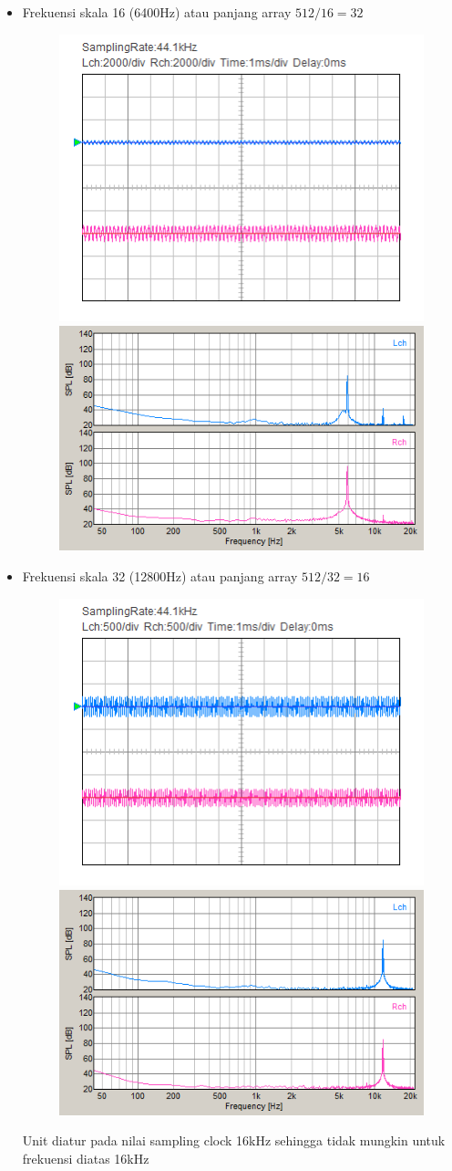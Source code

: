 \documentclass[12pt,]{article}
\begin{document}
\begin{itemize}
\begin{itemize}
			\item Frekuensi skala 16 (6400Hz) atau panjang array $512/16=32$
			\begin{figure}[H]
				\centering
				\includegraphics[width=0.45\linewidth]{result/day_4/osi_sine16}
				\includegraphics[width=0.45\linewidth]{result/day_4/fft_sine16}
			\end{figure}
		
			\item Frekuensi skala 32 (12800Hz) atau panjang array $512/32=16$
			\begin{figure}[H]
				\centering
				\includegraphics[width=0.45\linewidth]{result/day_4/newsinehighest}
				\includegraphics[width=0.45\linewidth]{result/day_4/newsinehighestfft}
			\end{figure}
			Unit diatur pada nilai sampling clock 16kHz sehingga tidak mungkin untuk
			frekuensi diatas 16kHz
			

\end{itemize}
\end{itemize}
\end{document}
